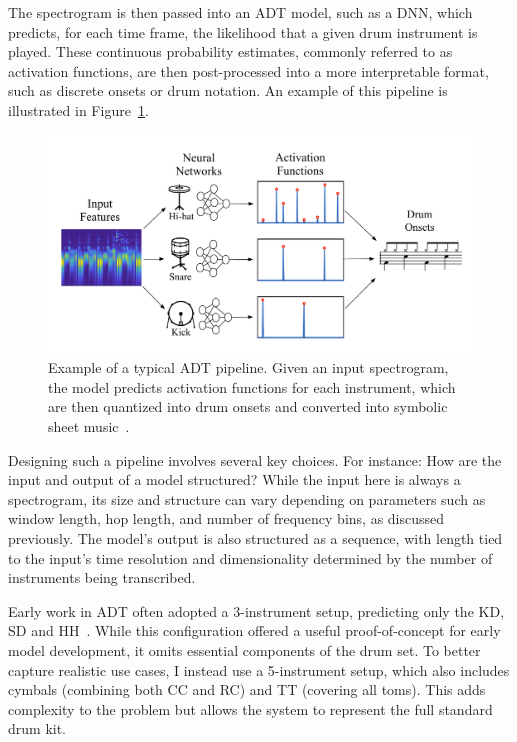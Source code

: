 The spectrogram is then passed into an \gls{ADT} model, such as a \gls{DNN}, which predicts, for each time frame, the likelihood that a given drum instrument is played. These continuous probability estimates, commonly referred to as activation functions, are then post-processed into a more interpretable format, such as discrete onsets or drum notation. An example of this pipeline is illustrated in Figure~\ref{ADTFigure}.

\begin{figure}[H]
    \centering
    \includegraphics[scale=1.9]{figures/adtpipeline.png}
    \caption{Example of a typical \gls{ADT} pipeline. Given an input spectrogram, the model predicts activation functions for each instrument, which are then quantized into drum onsets and converted into symbolic sheet music~\cite{Southall2016AutomaticDT}.}
    \label{ADTFigure}
\end{figure}

Designing such a pipeline involves several key choices. For instance: How are the input and output of a model structured? While the input here is always a spectrogram, its size and structure can vary depending on parameters such as window length, hop length, and number of frequency bins, as discussed previously. The model's output is also structured as a sequence, with length tied to the input's time resolution and dimensionality determined by the number of instruments being transcribed.

Early work in \gls{ADT} often adopted a 3-instrument setup, predicting only the \acrfull{KD}, \acrfull{SD} and \acrfull{HH}~\cite{vogl2016recurrent}. While this configuration offered a useful proof-of-concept for early model development, it omits essential components of the drum set. To better capture realistic use cases, I instead use a 5-instrument setup, which also includes cymbals (combining both \acrfull{CC} and \acrfull{RC}) and \acrfull{TT} (covering all toms). This adds complexity to the problem but allows the system to represent the full standard drum kit.



